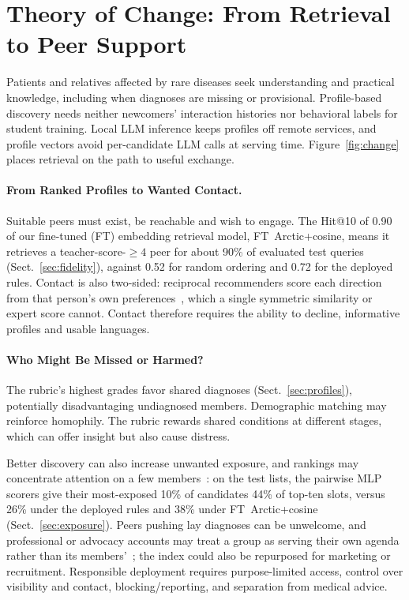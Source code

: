 \documentclass[runningheads,a4paper]{llncs}
\newcommand{\model}[1]{{\hyphenpenalty=10000 \exhyphenpenalty=10000 \textsf{#1}}}
\begin{document}
\section{Theory of Change: From Retrieval to Peer Support}
\label{sec:theory}
Patients and relatives affected by rare diseases seek understanding and
practical knowledge, including when diagnoses are missing or provisional.
Profile-based discovery needs neither newcomers' interaction histories nor
behavioral labels for student training. Local LLM inference keeps profiles off remote services,
and profile vectors avoid per-candidate LLM calls at serving time. Figure~\ref{fig:change} places retrieval on the path
to useful exchange.



\paragraph{From Ranked Profiles to Wanted Contact.}
Suitable peers must exist, be reachable and wish to engage. The Hit@10 of 0.90 of
our fine-tuned (FT) embedding retrieval model, \model{FT~Arctic+cosine}, means
it retrieves a teacher-score-$\geq4$ peer for about 90\% of evaluated test
queries (Sect.~\ref{sec:fidelity}), against 0.52 for random ordering and 0.72
for the deployed rules.
Contact is also two-sided: reciprocal recommenders score each direction from that person's own
preferences~\cite{pizzato2010recon}, which a single symmetric similarity or expert
score cannot. Contact therefore requires the ability to decline,
informative profiles and usable languages.

\paragraph{Who Might Be Missed or Harmed?}
The rubric's highest grades favor shared diagnoses (Sect.~\ref{sec:profiles}),
potentially disadvantaging undiagnosed members. Demographic matching may
reinforce homophily. The rubric rewards shared conditions at different stages,
which can offer insight but also cause distress.

Better discovery can also increase unwanted exposure, and rankings may
concentrate attention on a few members~\cite{biega2018attention}: on the test
lists, the pairwise MLP scorers give their most-exposed 10\% of candidates 44\% of
top-ten slots, versus 26\% under the deployed rules and 38\% under
\model{FT~Arctic+cosine} (Sect.~\ref{sec:exposure}). Peers pushing lay diagnoses can be unwelcome, and professional or advocacy
accounts may treat a group as serving their own agenda rather than its
members'~\cite{doyle2024support}; the index could also be repurposed for
marketing or recruitment. Responsible deployment requires purpose-limited access,
control over visibility and contact, blocking/reporting, and separation from
medical advice.
\end{document}
